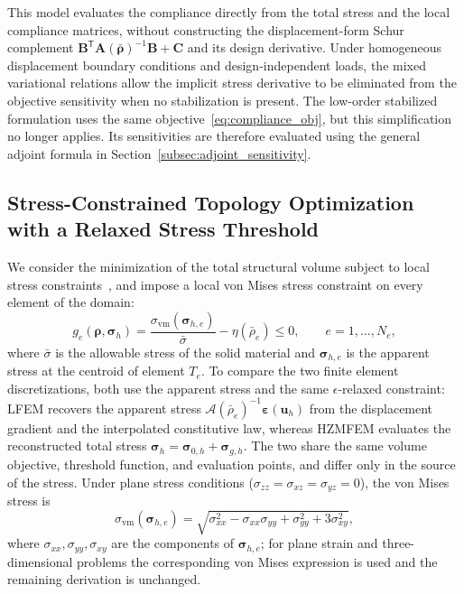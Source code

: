 This model evaluates the compliance directly from the total stress and the local compliance matrices, without constructing the displacement-form Schur complement $\boldsymbol{B}^{\mathsf T} \boldsymbol{A}(\bar{\boldsymbol{\rho}})^{-1} \boldsymbol{B} + \boldsymbol{C}$ and its design derivative. Under homogeneous displacement boundary conditions and design-independent loads, the mixed variational relations allow the implicit stress derivative to be eliminated from the objective sensitivity when no stabilization is present. The low-order stabilized formulation uses the same objective~\eqref{eq:compliance_obj}, but this simplification no longer applies. Its sensitivities are therefore evaluated using the general adjoint formula in Section~\ref{subsec:adjoint_sensitivity}.

\subsection{Stress-Constrained Topology Optimization with a Relaxed Stress Threshold}
\label{subsec:stress_constraints}

We consider the minimization of the total structural volume subject to local stress constraints~\cite{Duysinx1998,BruggiVenini2008}, and impose a local von Mises stress constraint on every element of the domain:
\begin{equation}
\label{eq:relaxed_stress_constraint}
g_e(\boldsymbol{\rho}, \boldsymbol{\sigma}_h)
= \frac{\sigma_{\mathrm{vm}}(\boldsymbol{\sigma}_{h,e})}{\bar{\sigma}} - \eta(\bar{\rho}_e) \le 0,
\qquad e = 1, \dots, N_e,
\end{equation}
where $\bar{\sigma}$ is the allowable stress of the solid material and $\boldsymbol{\sigma}_{h,e}$ is the apparent stress at the centroid of element $T_e$. To compare the two finite element discretizations, both use the apparent stress and the same $\epsilon$-relaxed constraint: LFEM recovers the apparent stress $\mathcal{A}(\bar{\rho}_e)^{-1} \boldsymbol{\varepsilon}(\boldsymbol{u}_h)$ from the displacement gradient and the interpolated constitutive law, whereas HZMFEM evaluates the reconstructed total stress $\boldsymbol{\sigma}_h = \boldsymbol{\sigma}_{0,h} + \boldsymbol{\sigma}_{g,h}$. The two share the same volume objective, threshold function, and evaluation points, and differ only in the source of the stress. Under plane stress conditions ($\sigma_{zz} = \sigma_{xz} = \sigma_{yz} = 0$), the von Mises stress is
\begin{equation*}
\sigma_{\mathrm{vm}}(\boldsymbol{\sigma}_{h,e})
= \sqrt{\sigma_{xx}^2 - \sigma_{xx}\sigma_{yy} + \sigma_{yy}^2 + 3\sigma_{xy}^2},
\end{equation*}
where $\sigma_{xx}, \sigma_{yy}, \sigma_{xy}$ are the components of $\boldsymbol{\sigma}_{h,e}$; for plane strain and three-dimensional problems the corresponding von Mises expression is used and the remaining derivation is unchanged.

